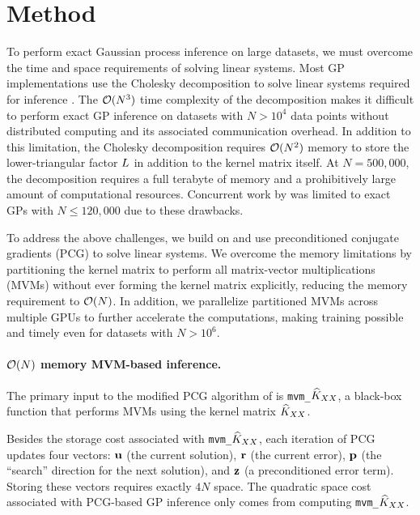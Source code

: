 \section{Method}
\label{sec:largeexact_method}
To perform exact Gaussian process inference on large datasets, we must overcome
the time and space requirements of solving linear systems.
Most GP implementations use the Cholesky decomposition to
solve linear systems required for inference \cite{rasmussen2006gaussian}.
The $\bigo{N^3}$ time complexity of the decomposition makes it difficult to perform exact GP inference on datasets with $N > 10^4$ data points without distributed computing and its associated communication overhead.
In addition to this limitation, the Cholesky decomposition requires
$\bigo{N^2}$ memory to store the lower-triangular factor $L$ in addition to the kernel matrix itself.
At $N=500,\!000$, the decomposition requires a full terabyte of memory and a prohibitively large
amount of computational resources.
Concurrent work by \citet{nguyen2019exact} was limited to exact GPs with $N \leq 120,\!000$ due to these drawbacks.

To address the above challenges, we build on \citet{gardner2018gpytorch} and use preconditioned conjugate gradients (PCG) to solve
linear systems. We overcome the memory limitations by partitioning the kernel
matrix to perform all matrix-vector multiplications (MVMs) without ever forming the kernel matrix explicitly,
reducing the memory requirement to $\bigo{N}$. In addition, we parallelize partitioned MVMs across multiple GPUs to
further accelerate the computations, making training possible and timely even for datasets with $N > 10^6$.

\paragraph{$\bigo{N}$ memory MVM-based inference.}
The primary input to the modified PCG algorithm of \citet{gardner2018gpytorch} is {\tt mvm\_$\widehat{K}_{XX}$}, a
black-box function that performs MVMs using the kernel matrix $\widehat{K}_{XX}$.

Besides the storage cost associated with {\tt mvm\_$\widehat{K}_{XX}$}, each iteration
of PCG updates four vectors: $\mathbf{u}$ (the current solution), $\mathbf{r}$ (the current error),
$\mathbf{p}$ (the ``search'' direction for the next solution), and $\mathbf{z}$ (a
preconditioned error term). Storing these vectors requires exactly $4N$ space.
The quadratic space cost associated with PCG-based GP inference only comes from computing {\tt mvm\_$\widehat{K}_{XX}$}.

